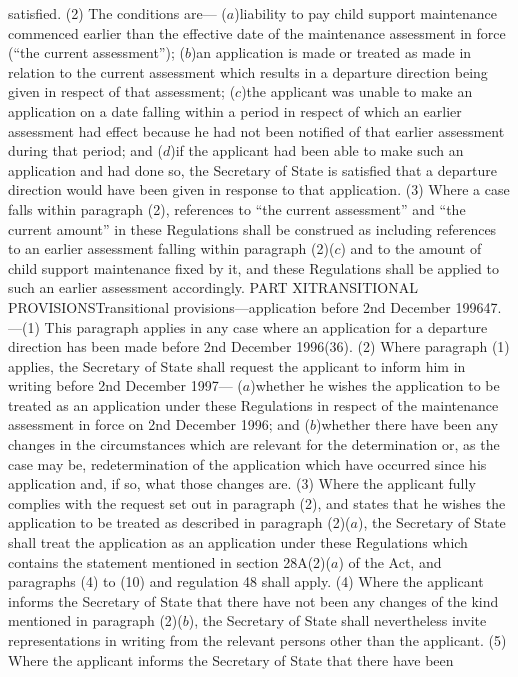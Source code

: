 \documentclass[a4paper]{article}
\begin{document}
satisfied.
(2) The conditions are—
($a$)liability to pay child support maintenance commenced earlier than the
effective date of the maintenance assessment in force (“the current
assessment”);
($b$)an application is made or treated as made in relation to the current
assessment which results in a departure direction being given in respect of that
assessment;
($c$)the applicant was unable to make an application on a date falling within a
period in respect of which an earlier assessment had effect because he had not
been notified of that earlier assessment during that period; and
($d$)if the applicant had been able to make such an application and had done so,
the Secretary of State is satisfied that a departure direction would have been
given in response to that application.
(3) Where a case falls within paragraph (2), references to “the current
assessment” and “the current amount” in these Regulations shall be construed as
including references to an earlier assessment falling within paragraph (2)($c$)
and to the amount of child support maintenance fixed by it, and these
Regulations shall be applied to such an earlier assessment accordingly.
PART XITRANSITIONAL PROVISIONSTransitional provisions—application before 2nd
December 199647.—(1) This paragraph applies in any case where an application for
a departure direction has been made before 2nd December 1996(36).
(2) Where paragraph (1) applies, the Secretary of State shall request the
applicant to inform him in writing before 2nd December 1997—
($a$)whether he wishes the application to be treated as an application under these
Regulations in respect of the maintenance assessment in force on 2nd December
1996; and
($b$)whether there have been any changes in the circumstances which are relevant
for the determination or, as the case may be, redetermination of the application
which have occurred since his application and, if so, what those changes are.
(3) Where the applicant fully complies with the request set out in paragraph
(2), and states that he wishes the application to be treated as described in
paragraph (2)($a$), the Secretary of State shall treat the application as an
application under these Regulations which contains the statement mentioned in
section 28A(2)($a$) of the Act, and paragraphs (4) to (10) and regulation 48 shall
apply.
(4) Where the applicant informs the Secretary of State that there have not been
any changes of the kind mentioned in paragraph (2)($b$), the Secretary of State
shall nevertheless invite representations in writing from the relevant persons
other than the applicant.
(5) Where the applicant informs the Secretary of State that there have been
\end{document}
